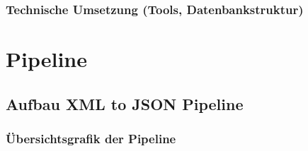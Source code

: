 \documentclass[12pt, a4paper, ngerman, bidi=default]{article}
\begin{document}
  \subsubsection{Technische Umsetzung (Tools, Datenbankstruktur)}



\section{Pipeline}

\subsection{Aufbau XML to JSON Pipeline}
\subsubsection{Übersichtsgrafik der Pipeline}


\vspace{6\baselineskip}
\end{document}
